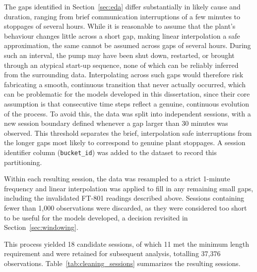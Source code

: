 The gaps identified in Section~\ref{sec:eda} differ substantially in likely cause and duration, ranging 
from brief communication interruptions of a few minutes to stoppages of several hours. While it is 
reasonable to assume that the plant's behaviour changes little across a short gap, making linear 
interpolation a safe approximation, the same cannot be assumed across gaps of several hours. During such 
an interval, the pump may have been shut down, restarted, or brought through an atypical start-up 
sequence, none of which can be reliably inferred from the surrounding data. Interpolating across such 
gaps would therefore risk fabricating a smooth, continuous transition that never actually occurred, which 
can be problematic for the models developed in this dissertation, since their 
core assumption is that consecutive time steps reflect a genuine, continuous evolution of the process. 
To avoid this, the data was split into independent sessions, with a new session 
boundary defined whenever a gap larger than 30 minutes was observed. This threshold separates the brief, 
interpolation safe interruptions from the longer gaps most likely to correspond to genuine plant 
stoppages. A session identifier column (\texttt{bucket\_id}) was added to the dataset to record this 
partitioning.

Within each resulting session, the data was resampled to a strict 1-minute frequency and linear 
interpolation was applied to fill in any remaining small gaps, including the invalidated FT-801 readings 
described above. 
Sessions containing fewer than 1{,}000 observations were discarded, as they were considered too short to 
be useful for the models developed, a decision revisited in Section~\ref{sec:windowing}.

This process yielded 18 candidate sessions, of which 11 met the minimum length requirement and were 
retained for subsequent analysis, totalling 37{,}376 observations. Table~\ref{tab:cleaning_sessions} 
summarizes the resulting sessions.

